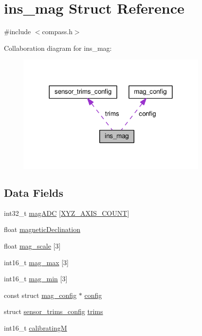 \hypertarget{structins__mag}{\section{ins\+\_\+mag Struct Reference}
\label{structins__mag}
}


{\ttfamily \#include $<$compass.\+h$>$}



Collaboration diagram for ins\+\_\+mag\+:\nopagebreak
\begin{figure}[H]
\begin{center}
\leavevmode
\includegraphics[width=269pt]{structins__mag__coll__graph}
\end{center}
\end{figure}
\subsection*{Data Fields}
\begin{DoxyCompactItemize}
\item 
int32\+\_\+t \hyperlink{structins__mag_a699e13cd3b68a4b44600e09f13809312}{mag\+A\+D\+C} \mbox{[}\hyperlink{axis_8h_a93ac071aee723ba4580dfc8b72ae847f}{X\+Y\+Z\+\_\+\+A\+X\+I\+S\+\_\+\+C\+O\+U\+N\+T}\mbox{]}
\item 
float \hyperlink{structins__mag_a936dac247a06599a356a582ed7c4588b}{magnetic\+Declination}
\item 
float \hyperlink{structins__mag_a6b46204e31f42f6416fbd5ed6f81354b}{mag\+\_\+scale} \mbox{[}3\mbox{]}
\item 
int16\+\_\+t \hyperlink{structins__mag_aefcecc497e66a7ec14d0b00dba2d6b3f}{mag\+\_\+max} \mbox{[}3\mbox{]}
\item 
int16\+\_\+t \hyperlink{structins__mag_a3c2f0607c799ae0f50e7c044c623767f}{mag\+\_\+min} \mbox{[}3\mbox{]}
\item 
const struct \hyperlink{structmag__config}{mag\+\_\+config} $\ast$ \hyperlink{structins__mag_a91fc5d77d0d1951b01074a2a7cbed73d}{config}
\item 
struct \hyperlink{structsensor__trims__config}{sensor\+\_\+trims\+\_\+config} \hyperlink{structins__mag_a5dbcf3f1de13ebc4ef78664e504320be}{trims}
\item 
int16\+\_\+t \hyperlink{structins__mag_afb144e5971a501b9b6b41cf12375afe1}{calibrating\+M}
\end{DoxyCompactItemize}


